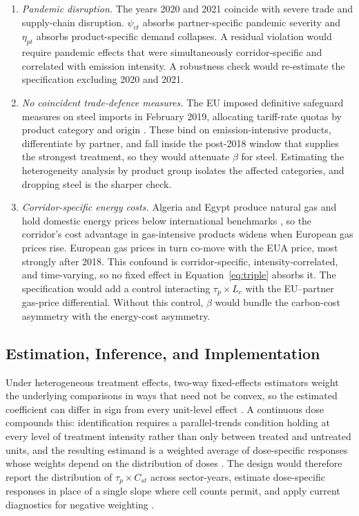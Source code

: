 \begin{enumerate}
\item \emph{Pandemic disruption.} The years 2020 and 2021 coincide with severe trade and supply-chain disruption. $\psi_{ct}$ absorbs partner-specific pandemic severity and $\eta_{pt}$ absorbs product-specific demand collapses. A residual violation would require pandemic effects that were simultaneously corridor-specific and correlated with emission intensity. A robustness check would re-estimate the specification excluding 2020 and 2021.

\item \emph{No coincident trade-defence measures.} The EU imposed definitive safeguard measures on steel imports in February 2019, allocating tariff-rate quotas by product category and origin \citep{safeguard2019}. These bind on emission-intensive products, differentiate by partner, and fall inside the post-2018 window that supplies the strongest treatment, so they would attenuate $\beta$ for steel. Estimating the heterogeneity analysis by product group isolates the affected categories, and dropping steel is the sharper check.

\item \emph{Corridor-specific energy costs.} Algeria and Egypt produce natural gas and hold domestic energy prices below international benchmarks \citep{iea2026}, so the corridor's cost advantage in gas-intensive products widens when European gas prices rise. European gas prices in turn co-move with the EUA price, most strongly after 2018. This confound is corridor-specific, intensity-correlated, and time-varying, so no fixed effect in Equation~\ref{eq:triple} absorbs it. The specification would add a control interacting $\tau_p \times L_c$ with the EU--partner gas-price differential. Without this control, $\beta$ would bundle the carbon-cost asymmetry with the energy-cost asymmetry.

\end{enumerate}

\subsection{Estimation, Inference, and Implementation}

Under heterogeneous treatment effects, two-way fixed-effects estimators weight the underlying comparisons in ways that need not be convex, so the estimated coefficient can differ in sign from every unit-level effect \citep{dechaisemartin2020}. A continuous dose compounds this: identification requires a parallel-trends condition holding at every level of treatment intensity rather than only between treated and untreated units, and the resulting estimand is a weighted average of dose-specific responses whose weights depend on the distribution of doses \citep{callaway2024}. The design would therefore report the distribution of $\tau_p \times C_{st}$ across sector-years, estimate dose-specific responses in place of a single slope where cell counts permit, and apply current diagnostics for negative weighting \citep{baker2026}.

